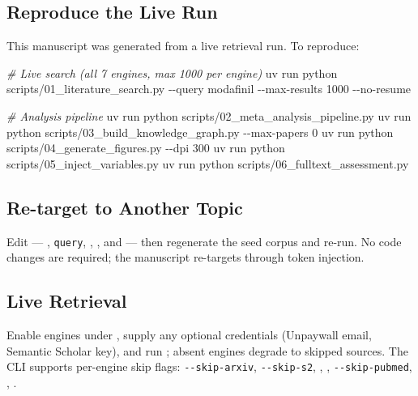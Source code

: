 \documentclass[
  english,
]{article}
\newenvironment{Shaded}{}{}
\newcommand{\AttributeTok}[1]{\textcolor[rgb]{0.49,0.56,0.16}{#1}}
\newcommand{\CommentTok}[1]{\textcolor[rgb]{0.38,0.63,0.69}{\textit{#1}}}
\newcommand{\ExtensionTok}[1]{#1}
\newcommand{\NormalTok}[1]{#1}
\begin{document}
\subsection{Reproduce the Live Run}\label{reproduce-the-live-run}

This manuscript was generated from a live retrieval run. To reproduce:

\begin{Shaded}
\begin{Highlighting}[]
\CommentTok{\# Live search (all 7 engines, max 1000 per engine)}
\ExtensionTok{uv}\NormalTok{ run python scripts/01\_literature\_search.py }\AttributeTok{{-}{-}query}\NormalTok{ modafinil }\AttributeTok{{-}{-}max{-}results}\NormalTok{ 1000 }\AttributeTok{{-}{-}no{-}resume}

\CommentTok{\# Analysis pipeline}
\ExtensionTok{uv}\NormalTok{ run python scripts/02\_meta\_analysis\_pipeline.py}
\ExtensionTok{uv}\NormalTok{ run python scripts/03\_build\_knowledge\_graph.py }\AttributeTok{{-}{-}max{-}papers}\NormalTok{ 0}
\ExtensionTok{uv}\NormalTok{ run python scripts/04\_generate\_figures.py }\AttributeTok{{-}{-}dpi}\NormalTok{ 300}
\ExtensionTok{uv}\NormalTok{ run python scripts/05\_inject\_variables.py}
\ExtensionTok{uv}\NormalTok{ run python scripts/06\_fulltext\_assessment.py}
\end{Highlighting}
\end{Shaded}

\subsection{Re-target to Another
Topic}\label{re-target-to-another-topic}

Edit  ---
, \texttt{query},
, , and
 --- then regenerate the seed corpus and
re-run. No code changes are required; the manuscript re-targets through
token injection.

\subsection{Live Retrieval}\label{live-retrieval}

Enable engines under , supply any
optional credentials (Unpaywall email, Semantic Scholar key), and run
; absent engines degrade to
skipped sources. The CLI supports per-engine skip flags:
\texttt{-\/-skip-arxiv}, \texttt{-\/-skip-s2},
, ,
\texttt{-\/-skip-pubmed}, ,
.
\end{document}
